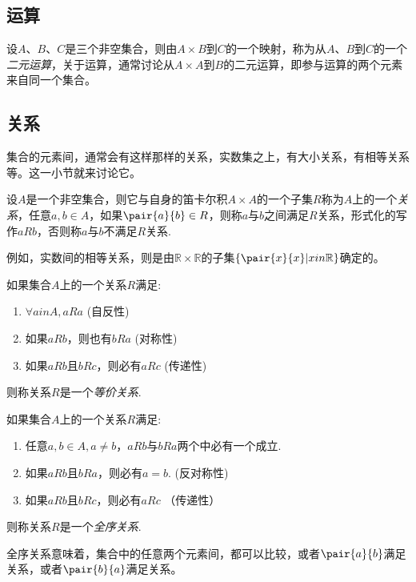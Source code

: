 \subsection{运算}
\label{sec:operation}

\begin{definition}
  设$A$、$B$、$C$是三个非空集合，则由$A \times B$到$C$的一个映射，称为从$A$、$B$到$C$的一个\emph{二元运算}，关于运算，通常讨论从$A \times A$到$B$的二元运算，即参与运算的两个元素来自同一个集合。
\end{definition}

\subsection{关系}
\label{sec:relation}

集合的元素间，通常会有这样那样的关系，实数集之上，有大小关系，有相等关系等。这一小节就来讨论它。

\begin{definition}
  设$A$是一个非空集合，则它与自身的笛卡尔积$A\times A$的一个子集$R$称为$A$上的一个\emph{关系}，任意$a,b \in A$，如果$\pair{a}{b} \in R$，则称$a$与$b$之间满足$R$关系，形式化的写作$aRb$，否则称$a$与$b$不满足$R$关系.
\end{definition}

例如，实数间的相等关系，则是由$\mathbb{R} \times \mathbb{R}$的子集$\{\pair{x}{x} | x in \mathbb{R}\}$确定的。

\begin{definition}
  如果集合$A$上的一个关系$R$满足:
  \begin{enumerate}
  \item $\forall a in A, aRa$ (自反性)
  \item 如果$aRb$，则也有$bRa$ (对称性)
  \item 如果$aRb$且$bRc$，则必有$aRc$ (传递性)
  \end{enumerate}
  则称关系$R$是一个\emph{等价关系}.
\end{definition}

\begin{definition}
  如果集合$A$上的一个关系$R$满足:
  \begin{enumerate}
  \item 任意$a,b \in A,a\neq b$，$aRb$与$bRa$两个中必有一个成立.
  \item 如果$aRb$且$bRa$，则必有$a=b$. (反对称性)
  \item 如果$aRb$且$bRc$，则必有$aRc$ （传递性）
  \end{enumerate}
  则称关系$R$是一个\emph{全序关系}.
\end{definition}
全序关系意味着，集合中的任意两个元素间，都可以比较，或者$\pair{a}{b}$满足关系，或者$\pair{b}{a}$满足关系。

